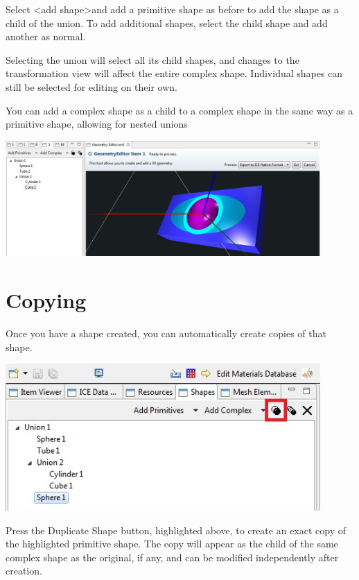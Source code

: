 \documentclass{article}
\begin{document}
Select \textless add shape\textgreater and add a primitive shape as before to
add the shape as a child of the union. To add additional shapes, select the child shape and add
another as normal.

Selecting the union will select all its child shapes, and changes to the
transformation view will affect the entire complex shape. Individual shapes can
still be selected for editing on their own.

You can add a complex shape as a child to a complex shape in the same way as a
primitive shape, allowing for nested unions

\begin{center}
\includegraphics[width=12cm]{images/GeometryStackedUnions.jpg}
\end{center}

\section{Copying}

Once you have a shape created, you can automatically create copies of that
shape. 

\begin{center}
\includegraphics[width=12cm]{images/GeometryDuplicateShape.jpg}
\end{center}

Press the Duplicate Shape button, highlighted above, to create an exact copy of
the highlighted primitive shape. The copy will appear as the child of the same
complex shape as the original, if any, and can be modified independently after
creation.
\end{document}
